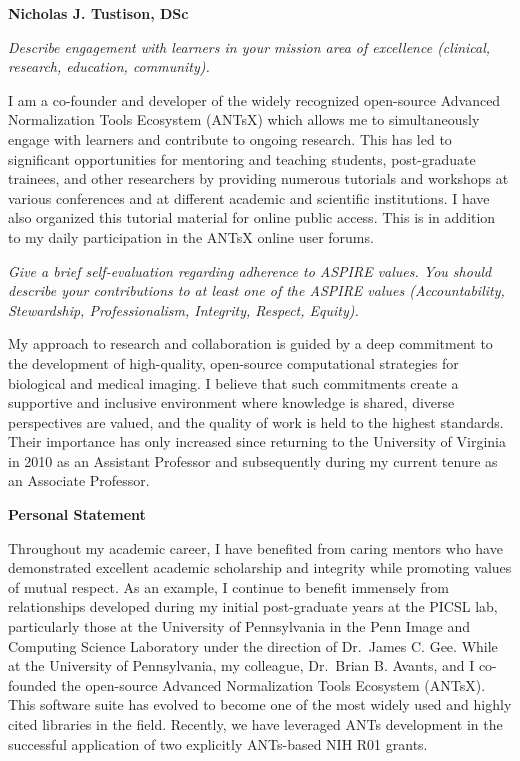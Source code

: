 \documentclass[
  11pt,
]{article}
\author{}
\date{\vspace{-2.5em}}
\begin{document}

\textbf{Nicholas J. Tustison, DSc}

\emph{Describe engagement with learners in your mission area of
excellence (clinical, research, education, community).}

I am a co-founder and developer of the widely recognized open-source
Advanced Normalization Tools Ecosystem (ANTsX) which allows me to
simultaneously engage with learners and contribute to ongoing research.
This has led to significant opportunities for mentoring and teaching
students, post-graduate trainees, and other researchers by providing
numerous tutorials and workshops at various conferences and at different
academic and scientific institutions. I have also organized this
tutorial material for online public access. This is in addition to my
daily participation in the ANTsX online user forums.

\emph{Give a brief self-evaluation regarding adherence to ASPIRE values.
You should describe your contributions to at least one of the ASPIRE
values (Accountability, Stewardship, Professionalism, Integrity,
Respect, Equity).}

My approach to research and collaboration is guided by a deep commitment
to the development of high-quality, open-source computational strategies
for biological and medical imaging. I believe that such commitments
create a supportive and inclusive environment where knowledge is shared,
diverse perspectives are valued, and the quality of work is held to the
highest standards. Their importance has only increased since returning
to the University of Virginia in 2010 as an Assistant Professor and
subsequently during my current tenure as an Associate Professor.

\textbf{Personal Statement}

Throughout my academic career, I have benefited from caring mentors who
have demonstrated excellent academic scholarship and integrity while
promoting values of mutual respect. As an example, I continue to benefit
immensely from relationships developed during my initial post-graduate
years at the PICSL lab, particularly those at the University of
Pennsylvania in the Penn Image and Computing Science Laboratory under
the direction of Dr.~James C. Gee. While at the University of
Pennsylvania, my colleague, Dr.~Brian B. Avants, and I co-founded the
open-source Advanced Normalization Tools Ecosystem (ANTsX). This
software suite has evolved to become one of the most widely used and
highly cited libraries in the field. Recently, we have leveraged ANTs
development in the successful application of two explicitly ANTs-based
NIH R01 grants.
\end{document}
